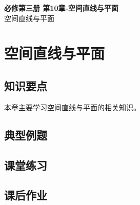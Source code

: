 \documentclass[12pt,a4paper]{article}
\begin{document}
\begin{center}
\LARGE\textbf{必修第三册 第10章-空间直线与平面} \\[0.5em]
\large 空间直线与平面
\end{center}

\tableofcontents
\newpage

\section{空间直线与平面}

\subsection{知识要点}
本章主要学习空间直线与平面的相关知识。

\subsection{典型例题}

\subsection{课堂练习}

\subsection{课后作业}
\end{document}
